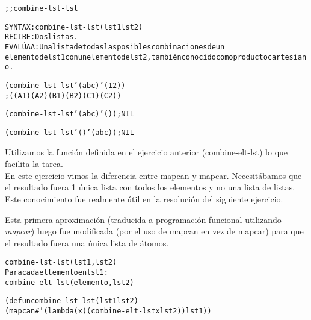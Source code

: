 \begin{aibox}{\function}
\begin{alltt}
;; combine-lst-lst

SYNTAX: combine-lst-lst (lst1 lst2)
RECIBE: Dos listas.
EVALÚA A: Una lista de todas las posibles combinaciones de un 
elemento de lst1 con un elemento de lst2, también conocido como producto cartesiano.
\end{alltt}
\end{aibox}

\begin{aibox}{\examples}
\begin{alltt}
(combine-lst-lst '(a b c) '(1 2))
; ((A 1) (A 2) (B 1) (B 2) (C 1) (C 2))

(combine-lst-lst '(a b c) '()); NIL

(combine-lst-lst '() '(a b c)); NIL
\end{alltt}

\end{aibox}

\begin{aibox}{\comments}
Utilizamos la función definida en el ejercicio anterior (combine-elt-lst) lo que facilita la tarea.\\
En este ejercicio vimos la diferencia entre mapcan y mapcar. Necesitábamos que el resultado fuera 1 única lista con todos los elementos y no una lista de listas. Este conocimiento fue realmente útil en la resolución del siguiente ejercicio.
\end{aibox}
\begin{aibox}{\pseudocode}
Esta primera aproximación (traducida a programación funcional utilizando \emph{mapcar}) luego fue modificada (por el uso de mapcan en vez de mapcar) para que el resultado fuera una única lista de átomos.
\begin{alltt}
combine-lst-lst (lst1,lst2)
    Para cada eltemento en lst1:
        combine-elt-lst (elemento,lst2)
\end{alltt}
\end{aibox}
\begin{aibox}{\code}

\begin{alltt}

(defun combine-lst-lst (lst1 lst2)
            (mapcan #'(lambda (x) (combine-elt-lst x lst2)) lst1))

\end{alltt}
\end{aibox}
